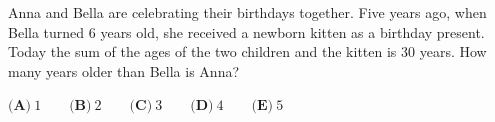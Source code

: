 Anna and Bella are celebrating their birthdays together. Five years ago, when Bella turned $6$ years old, she received a newborn kitten as a birthday present. Today the sum of the ages of the two children and the kitten is $30$ years. How many years older than Bella is Anna?

$\textbf{(A)}\ 1\qquad\textbf{(B)}\ 2\qquad\textbf{(C)}\ 3\qquad\textbf{(D)}\ 4\qquad\textbf{(E)}\ 5$
